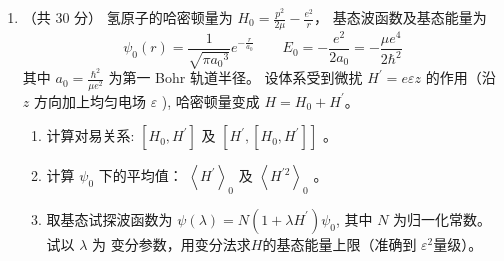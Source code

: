 \begin{enumerate}
{}
\item 
（共 30 分）
氢原子的哈密顿量为 $H_{0}=\frac{p^{2}}{2 \mu}-\frac{e^{2}}{r} $， 基态波函数及基态能量为
$$
\psi_{0}(r)=\frac{1}{\sqrt{\pi a_{0}{ }^{3}}} e^{-\frac{r}{a_{0}}} \qquad  E_{0}=-\frac{e^{2}}{2 a_{0}}=-\frac{\mu e^{4}}{2 \hbar^{2}}
$$
其中 $a_{0}=\frac{\hbar^{2}}{\mu e^{2}}$ 为第一 Bohr 轨道半径。
设体系受到微扰 $H^{\prime}=e \varepsilon z$ 的作用（沿 $z$ 方向加上均匀电场 $\varepsilon$ ), 哈密顿量变成 $H=H_{0}+H^{\prime}$。
\begin{enumerate}
	\item
	计算对易关系: $\left[H_{0}, H^{\prime}\right]$ 及 $\left[H^{\prime},\left[H_{0}, H^{\prime}\right]\right]$ 。
	\item 
	计算 $\psi_{0}$ 下的平均值： $\left\langle H^{\prime}\right\rangle_{0}$ 及 $\left\langle H^{\prime 2}\right\rangle_{0}$ 。
	\item 
	取基态试探波函数为 $\psi(\lambda)=N\left(1+\lambda H^{\prime}\right) \psi_{0}$, 其中 $N$ 为归一化常数。试以 $\lambda$ 为
	变分参数，用变分法求$  H  $的基态能量上限（准确到
$\varepsilon^{2}$量级）。
	
	
\end{enumerate}





\end{enumerate}

